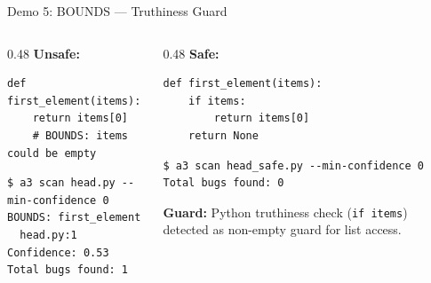 \documentclass[aspectratio=169]{beamer}
\begin{document}
\begin{frame}[fragile]{Demo 5: BOUNDS --- Truthiness Guard}

\begin{columns}[T]
\begin{column}{0.48\textwidth}
\textbf{Unsafe:}
\begin{lstlisting}
def first_element(items):
    return items[0]
    # BOUNDS: items could be empty
\end{lstlisting}

\begin{lstlisting}[style=bash]
$ a3 scan head.py --min-confidence 0
BOUNDS: first_element
  head.py:1  Confidence: 0.53
Total bugs found: 1
\end{lstlisting}
\end{column}
\begin{column}{0.48\textwidth}
\textbf{Safe:}
\begin{lstlisting}
def first_element(items):
    if items:
        return items[0]
    return None
\end{lstlisting}

\begin{lstlisting}[style=bash]
$ a3 scan head_safe.py --min-confidence 0
Total bugs found: 0
\end{lstlisting}
\vspace{0.3em}
\textbf{Guard:} Python truthiness check (\texttt{if items}) detected as non-empty guard for list access.
\end{column}
\end{columns}

\end{frame}
\end{document}
